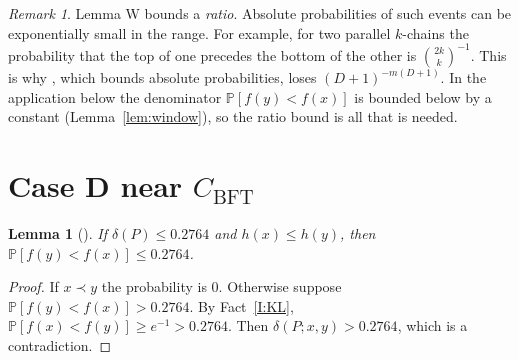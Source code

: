 \documentclass[10pt]{amsart}
\newtheorem{lemma}[theorem]{Lemma}
\theoremstyle{definition}
\theoremstyle{remark}
\newtheorem{remark}[theorem]{Remark}
\newcommand{\PP}{\mathbb{P}}
\newcommand{\CB}{C_{\mathrm{BFT}}}
\begin{document}
\begin{remark}
Lemma W bounds a \emph{ratio}. Absolute probabilities of such events can be exponentially small in the range.
For example, for two parallel $k$-chains the probability that the top of one precedes the bottom of the other is $\binom{2k}{k}^{-1}$.
This is why \cite[Lemma~3.1]{KSBFT}, which bounds absolute probabilities, loses $(D+1)^{-m(D+1)}$.
In the application below the denominator $\PP[f(y)<f(x)]$ is bounded below by a constant (Lemma~\ref{lem:window}), so the ratio bound is all that is needed.
\end{remark}

\section{\texorpdfstring{Case D near $\CB$}{Case D near C\_BFT}}

\begin{lemma}[{\cite[Cor.~2.2]{KSBFT}}]\label{lem:cor22}
If $\delta(P)\le 0.2764$ and $h(x)\le h(y)$, then $\PP[f(y)<f(x)]\le 0.2764$.
\end{lemma}
\begin{proof}
If $x\prec y$ the probability is $0$.
Otherwise suppose $\PP[f(y)<f(x)]>0.2764$. By Fact~\ref{I:KL}, $\PP[f(x)<f(y)]\ge e^{-1}>0.2764$.
Then $\delta(P;x,y)>0.2764$, which is a contradiction.
\end{proof}
\end{document}
